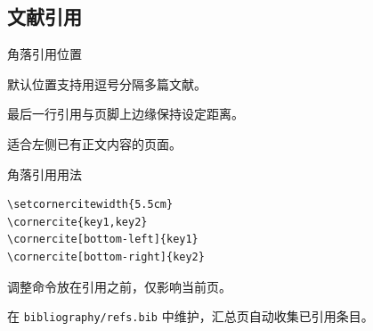 \subsection{文献引用}

\begin{frame}{角落引用位置}
      \setcornercitewidth{5.5cm} %
      \begin{description}[右上]
            \item[右上] 默认位置支持用逗号分隔多篇文献。
            \item[左下] 最后一行引用与页脚上边缘保持设定距离。
            \item[右下] 适合左侧已有正文内容的页面。
      \end{description}

\end{frame}

\begin{frame}[fragile]{角落引用用法}
      \begin{verbatim}
\setcornercitewidth{5.5cm}
\cornercite{key1,key2}
\cornercite[bottom-left]{key1}
\cornercite[bottom-right]{key2}
      \end{verbatim}
      \begin{description}[引用宽度]
            \item[引用宽度] 调整命令放在引用之前，仅影响当前页。
            \item[文献信息] 在 \texttt{bibliography/refs.bib} 中维护，汇总页自动收集已引用条目。
      \end{description}
\end{frame}


